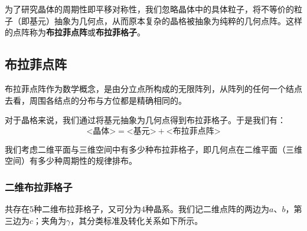     为了研究晶体的周期性即平移对称性，我们忽略晶体中的具体粒子，将不等价的粒子（即基元）抽象为几何点，从而原本复杂的晶格被抽象为纯粹的几何点阵。这样的点阵称为\textbf{布拉菲点阵}或\textbf{布拉菲格子}。

\subsection{布拉菲点阵}
    布拉菲点阵作为数学概念，是由分立点所构成的无限阵列，从阵列的任何一个结点去看，周围各结点的分布与方位都是精确相同的。

    对于晶格来说，我们通过将基元抽象为几何点得到布拉菲格子。于是我们有：
    \[
        \mbox{<晶体>}=\mbox{<基元>}+\mbox{<布拉菲点阵>}
    \]
    
    我们考虑二维平面与三维空间中有多少种布拉菲格子，即几何点在二维平面（三维空间）有多少种周期性的规律排布。

\subsubsection{二维布拉菲格子}
    共存在5种二维布拉菲格子，又可分为4种晶系。我们记二维点阵的两边为$a$、$b$，第三边为$c$；夹角为$\gamma$，其分类标准及转化关系如下所示。

    \begin{table}[!htbp]
        \centering
        \caption{二维布拉菲格子}
        \label{tab:1-5}
    \end{table}

